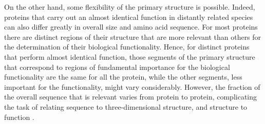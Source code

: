 On the other hand, some flexibility of the primary structure is possible. Indeed, proteins that carry out an almost identical function in distantly related species can also differ greatly in overall size and amino acid sequence. For most proteins 
there are distinct regions of their structure that are more relevant than others for the determination of their biological functionality. Hence, for distinct proteins that perform almost identical function, those segments of the primary structure that correspond to regions of fundamental importance for the biological functionality are the same for all the protein, while the other segments, less important for the functionality, might vary considerably. However, the fraction of the overall sequence that is relevant varies from protein to protein, complicating the task of relating sequence to three-dimensional structure, and structure to function
\cite{nelson2008lehninger}.


